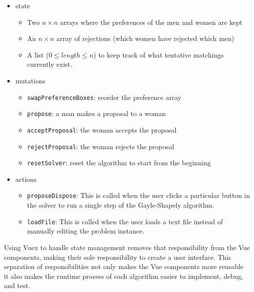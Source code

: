 \begin{itemize}
	\item state
	\begin{itemize}
		\item Two $n \times n$ arrays where the preferences of the men and women are kept
		\item An $n \times n$ array of rejections (which women have rejected which men)
		\item A list ($0\leq length \leq n$) to keep track of what tentative matchings currently exist. 
	\end{itemize}
	\item mutations
	\begin{itemize}
		\item \texttt{swapPreferenceBoxes}: reorder the preference array
		\item \texttt{propose}: a man makes a proposal to a woman
		\item \texttt{acceptProposal}: the woman accepts the proposal
		\item \texttt{rejectProposal}: the woman rejects the proposal
		\item \texttt{resetSolver}: reset the algorithm to start from the beginning
	\end{itemize}
	\item actions
	\begin{itemize}
		\item \texttt{proposeDispose}: This is called when the user clicks a particular button in the solver
							to run a single step of the Gayle-Shapely algorithm.
		\item \texttt{loadFile}: This is called when the user loads a text file instead of manually 
							editing the problem instance. 
	\end{itemize}
\end{itemize}
Using Vuex to handle state management removes that responsibility from the Vue components,
making their sole responsibility to create a user interface. 
This separation of responsibilities not only makes the Vue components more reusable
it also makes the runtime process of each algorithm easier to 
implement, debug, and test.